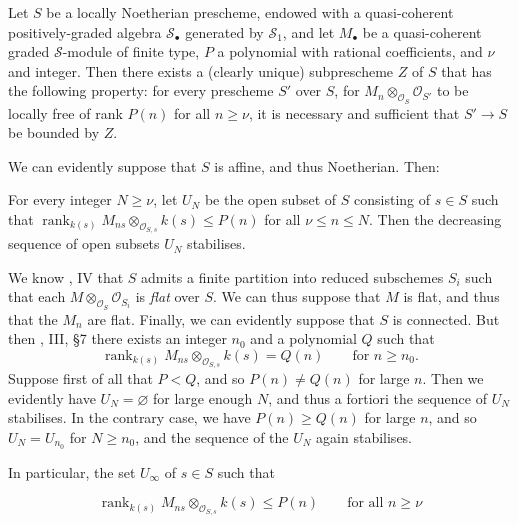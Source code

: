\begin{lemma}\label{fga3.iv-3-lemma-3.4}
  Let $S$ be a locally Noetherian prescheme, endowed with a quasi-coherent positively-graded algebra $\mathcal{S}_\bullet$ generated by $\mathcal{S}_1$, and let $M_\bullet$ be a quasi-coherent graded $\mathcal{S}$-module of finite type, $P$ a polynomial with rational coefficients, and $\nu$ and integer.
  Then there exists a (clearly unique) subprescheme $Z$ of $S$ that has the following property:
  for every prescheme $S'$ over $S$, for $M_n\otimes_{\mathcal{O}_S}\mathcal{O}_{S'}$ to be locally free of rank $P(n)$ for all $n\geqslant\nu$, it is necessary and sufficient that $S'\to S$ be bounded by $Z$.
\end{lemma}


We can evidently suppose that $S$ is affine, and thus Noetherian.
Then:


\begin{lemma}\label{fga3.iv-3-lemma-3.5}
  For every integer $N\geqslant\nu$, let $U_N$ be the open subset of $S$ consisting of $s\in S$ such that $\operatorname{rank}_{k(s)}M_{ns}\otimes_{\mathcal{O}_{S,s}} k(s)\leqslant P(n)$ for all $\nu\leqslant n\leqslant N$.
  Then the decreasing sequence of open subsets $U_N$ stabilises.
\end{lemma}

\begin{cproof}
  We know \cite{Gro1960b}, IV that $S$ admits a finite partition into reduced subschemes $S_i$ such that each $M\otimes_{\mathcal{O}_S}\mathcal{O}_{S_i}$ is \emph{flat} over $S$.
  We can thus suppose that $M$ is flat, and thus that the $M_n$ are flat.
  Finally, we can evidently suppose that $S$ is connected.
  But then \cite{GD1960}, III, §7 there exists an integer $n_0$ and a polynomial $Q$ such that
  \[
    \operatorname{rank}_{k(s)}M_{ns}\otimes_{\mathcal{O}_{S,s}} k(s)
    = Q(n)
    \qquad\text{for } n\geqslant n_0.
  \]
  Suppose first of all that $P<Q$, and so $P(n)\neq Q(n)$ for large $n$.
  Then we evidently have $U_N=\varnothing$ for large enough $N$, and thus a fortiori the sequence of $U_N$ stabilises.
  In the contrary case, we have $P(n)\geqslant Q(n)$ for large $n$, and so $U_N=U_{n_0}$ for $N\geqslant n_0$, and the sequence of the $U_N$ again stabilises.
\end{cproof}


In particular, the set $U_\infty$ of $s\in S$ such that

\begin{equation}\tag{*}\label{fga3.iv-3-equation-star}
  \operatorname{rank}_{k(s)}M_{ns}\otimes_{\mathcal{O}_{S,s}} k(s) \leqslant P(n)
  \qquad\text{for all } n\geqslant\nu
\end{equation}

